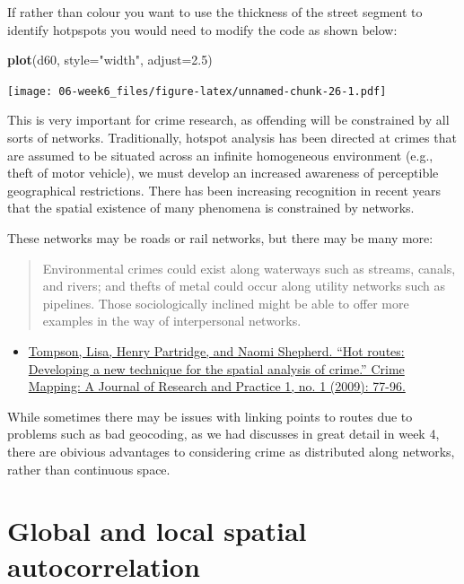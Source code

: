 \documentclass[]{book}
\newenvironment{Shaded}{\begin{snugshade}}{\end{snugshade}}
\newcommand{\DataTypeTok}[1]{\textcolor[rgb]{0.13,0.29,0.53}{#1}}
\newcommand{\FloatTok}[1]{\textcolor[rgb]{0.00,0.00,0.81}{#1}}
\newcommand{\KeywordTok}[1]{\textcolor[rgb]{0.13,0.29,0.53}{\textbf{#1}}}
\newcommand{\NormalTok}[1]{#1}
\newcommand{\StringTok}[1]{\textcolor[rgb]{0.31,0.60,0.02}{#1}}
\providecommand{\tightlist}{%
  \setlength{\itemsep}{0pt}\setlength{\parskip}{0pt}}
\begin{document}
If rather than colour you want to use the thickness of the street segment to identify hotpspots you would need to modify the code as shown below:

\begin{Shaded}
\begin{Highlighting}[]
\KeywordTok{plot}\NormalTok{(d60, }\DataTypeTok{style=}\StringTok{"width"}\NormalTok{, }\DataTypeTok{adjust=}\FloatTok{2.5}\NormalTok{)}
\end{Highlighting}
\end{Shaded}

\texttt{[image: 06-week6\_files/figure-latex/unnamed-chunk-26-1.pdf]}

This is very important for crime research, as offending will be constrained by all sorts of networks. Traditionally, hotspot analysis has been directed at crimes that are assumed to be situated across an infinite homogeneous environment (e.g., theft of motor vehicle), we must develop an increased awareness of perceptible geographical restrictions. There has been increasing recognition in recent years that the spatial existence of many phenomena is constrained by networks.

These networks may be roads or rail networks, but there may be many more:

\begin{quote}
Environmental crimes could exist along waterways such as streams, canals, and rivers; and thefts of metal could occur along utility networks such as pipelines. Those
sociologically inclined might be able to offer more examples in the way of interpersonal networks.
\end{quote}

\begin{itemize}
\tightlist
\item
  \href{http://discovery.ucl.ac.uk/20057/}{Tompson, Lisa, Henry Partridge, and Naomi Shepherd. ``Hot routes: Developing a new technique for the spatial analysis of crime.'' Crime Mapping: A Journal of Research and Practice 1, no. 1 (2009): 77-96.}
\end{itemize}

While sometimes there may be issues with linking points to routes due to problems such as bad geocoding, as we had discusses in great detail in week 4, there are obivious advantages to considering crime as distributed along networks, rather than continuous space.

\hypertarget{global-and-local-spatial-autocorrelation}{%
\chapter{Global and local spatial autocorrelation}\label{global-and-local-spatial-autocorrelation}}
\end{document}
